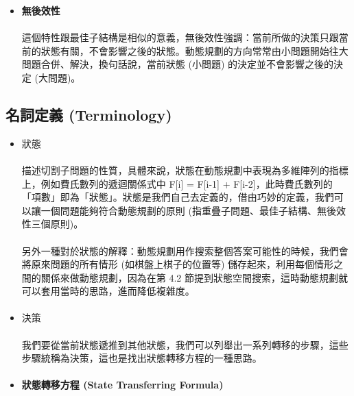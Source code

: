 \documentclass[12pt,a4paper,oneside]{report}
\begin{document}
\begin{CJK}{UTF8}{bkai}
\begin{itemize}
\item \textbf{無後效性}
\paragraph{}這個特性跟最佳子結構是相似的意義，無後效性強調：當前所做的決策只跟當前的狀態有關，不會影響之後的狀態。動態規劃的方向常常由小問題開始往大問題合併、解決，換句話說，當前狀態 (小問題) 的決定並不會影響之後的決定 (大問題)。

\end{itemize}

\subsection{名詞定義 (Terminology)}

\begin{itemize}
\item 狀態
\paragraph{}描述切割子問題的性質，具體來說，狀態在動態規劃中表現為多維陣列的指標上，例如費氏數列的遞迴關係式中 F[i] = F[i-1] + F[i-2]，此時費氏數列的「項數」即為「狀態」。狀態是我們自己去定義的，借由巧妙的定義，我們可以讓一個問題能夠符合動態規劃的原則 (指重疊子問題、最佳子結構、無後效性三個原則)。
\paragraph{}另外一種對於狀態的解釋：動態規劃用作搜索整個答案可能性的時候，我們會將原來問題的所有情形 (如棋盤上棋子的位置等) 儲存起來，利用每個情形之間的關係來做動態規劃，因為在第 4.2 節提到狀態空間搜索，這時動態規劃就可以套用當時的思路，進而降低複雜度。
\paragraph{}

\item 決策
\paragraph{}我們要從當前狀態遞推到其他狀態，我們可以列舉出一系列轉移的步驟，這些步驟統稱為決策，這也是找出狀態轉移方程的一種思路。
\paragraph{}

\item \textbf{狀態轉移方程 (State Transferring Formula)}

\end{itemize}
\end{CJK}
\end{document}

